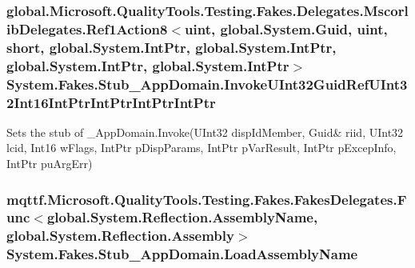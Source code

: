 \hypertarget{class_system_1_1_fakes_1_1_stub___app_domain_a63c2abe47849f38271334472e231ef3c}{
\subsubsection[{Invoke\-U\-Int32\-Guid\-Ref\-U\-Int32\-Int16\-Int\-Ptr\-Int\-Ptr\-Int\-Ptr\-Int\-Ptr}]{\setlength{\rightskip}{0pt plus 5cm}global.\-Microsoft.\-Quality\-Tools.\-Testing.\-Fakes.\-Delegates.\-Mscorlib\-Delegates.\-Ref1\-Action8$<$uint, global.\-System.\-Guid, uint, short, global.\-System.\-Int\-Ptr, global.\-System.\-Int\-Ptr, global.\-System.\-Int\-Ptr, global.\-System.\-Int\-Ptr$>$ System.\-Fakes.\-Stub\-\_\-\-App\-Domain.\-Invoke\-U\-Int32\-Guid\-Ref\-U\-Int32\-Int16\-Int\-Ptr\-Int\-Ptr\-Int\-Ptr\-Int\-Ptr}}\label{class_system_1_1_fakes_1_1_stub___app_domain_a63c2abe47849f38271334472e231ef3c}


Sets the stub of \-\_\-\-App\-Domain.\-Invoke(U\-Int32 disp\-Id\-Member, Guid\& riid, U\-Int32 lcid, Int16 w\-Flags, Int\-Ptr p\-Disp\-Params, Int\-Ptr p\-Var\-Result, Int\-Ptr p\-Excep\-Info, Int\-Ptr pu\-Arg\-Err)

\hypertarget{class_system_1_1_fakes_1_1_stub___app_domain_a0244f80214ed7f051c2e41fb16d95ebe}{
\subsubsection[{Load\-Assembly\-Name}]{\setlength{\rightskip}{0pt plus 5cm}mqttf.\-Microsoft.\-Quality\-Tools.\-Testing.\-Fakes.\-Fakes\-Delegates.\-Func$<$global.\-System.\-Reflection.\-Assembly\-Name, global.\-System.\-Reflection.\-Assembly$>$ System.\-Fakes.\-Stub\-\_\-\-App\-Domain.\-Load\-Assembly\-Name}}\label{class_system_1_1_fakes_1_1_stub___app_domain_a0244f80214ed7f051c2e41fb16d95ebe}


